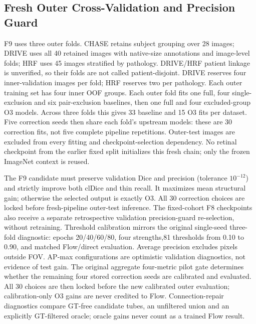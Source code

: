 \documentclass[jimaging,article,submit,pdftex,moreauthors]{Definitions/mdpi}
\begin{document}
\subsection{Fresh Outer Cross-Validation and Precision Guard}
F9 uses three outer folds. CHASE retains subject grouping over 28 images;
DRIVE uses all 40 retained images with native-size annotations and image-level
folds; HRF uses 45 images stratified by pathology. DRIVE/HRF patient linkage is
unverified, so their folds are not called patient-disjoint. DRIVE reserves four
inner-validation images per fold; HRF reserves two per pathology. Each outer
training set has four inner OOF groups. Each outer fold fits one full,
four single-exclusion and six pair-exclusion baselines, then one full and
four excluded-group O3 models. Across three folds this gives 33 baseline and
15 O3 fits per dataset. Five correction seeds then share each fold's upstream
models: these are 30 correction fits, not five complete pipeline repetitions.
Outer-test images are excluded from every fitting and checkpoint-selection
dependency. No retinal checkpoint from the earlier fixed split initializes this
fresh chain; only the frozen ImageNet context is reused.

The F9 candidate must preserve validation Dice and precision (tolerance
$10^{-12}$) and strictly improve both clDice and thin recall. It maximizes mean
structural gain; otherwise the selected output is exactly O3. All 30 correction
choices are locked before fresh-pipeline outer-test inference. The fixed-cohort F8
checkpoints also receive a separate retrospective validation precision-guard
re-selection, without retraining. Threshold calibration mirrors the original
single-seed three-fold diagnostic: epochs 20/40/60/80, four strengths,81 thresholds
from 0.10 to 0.90, and matched Flow/direct evaluation. Average precision excludes
pixels outside FOV. AP-max configurations are optimistic validation diagnostics,
not evidence of test gain. The original aggregate four-metric pilot gate
determines whether the remaining four stored correction seeds are calibrated
and evaluated. All 30 choices are then locked before the new calibrated outer
evaluation; calibration-only O3 gains are never credited to Flow.
Connection-repair diagnostics compare GT-free
candidate tubes, an unfiltered union and an explicitly GT-filtered oracle;
oracle gains never count as a trained Flow result.

\end{document}
